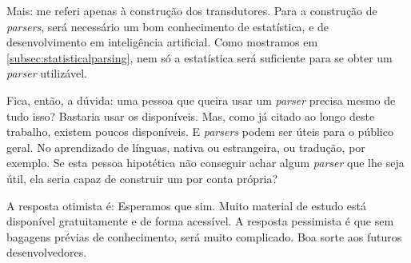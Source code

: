 Mais: me referi apenas à construção dos transdutores. Para a construção de \textit{parsers}, será necessário um bom conhecimento de estatística, e de desenvolvimento em inteligência artificial. Como mostramos em \ref{subsec:statisticalparsing}, nem só a estatística será suficiente para se obter um \textit{parser} utilizável.

Fica, então, a dúvida: uma pessoa que queira usar um \textit{parser} precisa mesmo de tudo isso? Bastaria usar os disponíveis. Mas, como já citado ao longo deste trabalho, existem poucos disponíveis. E \textit{parsers} podem ser úteis para o público geral. No aprendizado de línguas, nativa ou estrangeira, ou tradução, por exemplo. Se esta pessoa hipotética não conseguir achar algum \textit{parser} que lhe seja útil, ela seria capaz de construir um por conta própria?

A resposta otimista é: Esperamos que sim. Muito material de estudo está disponível gratuitamente e de forma acessível. A resposta pessimista é que sem bagagens prévias de conhecimento, será muito complicado. Boa sorte aos futuros desenvolvedores.